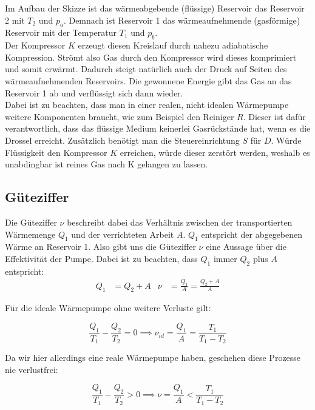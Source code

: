 Im Aufbau der Skizze ist das wärmeabgebende (flüssige) Reservoir das Reservoir 2 mit $T_{2}$ und $p_{a}$. Demnach ist Reservoir 1 das wärmeaufnehmende
(gasförmige) Reservoir mit der Temperatur $T_{1}$ und $p_{b}$. \\

Der Kompressor $K$ erzeugt diesen Kreislauf durch nahezu adiabatische Kompression. Strömt also Gas durch den 
Kompressor wird dieses komprimiert und somit erwärmt.
Dadurch steigt natürlich auch der Druck auf Seiten des wärmeaufnehmenden Reservoirs.
Die gewonnene Energie gibt das Gas an das Reservoir 1 ab und verflüssigt sich dann wieder.\\

Dabei ist zu beachten, dass man in einer realen, nicht idealen Wärmepumpe weitere Komponenten braucht, wie zum Beispiel den Reiniger $R$.
Dieser ist dafür verantwortlich, dass das flüssige Medium keinerlei Gasrückstände hat, wenn es die Drossel erreicht.
Zusätzlich benötigt man die Steuereinrichtung $S$ für $D$. Würde Flüssigkeit den Kompressor $K$ erreichen, würde dieser zerstört werden,
weshalb es unabdingbar ist reines Gas nach K gelangen zu lassen.

\subsection{Güteziffer} \label{sec:Güteziffer}

Die Güteziffer $\nu$ beschreibt dabei das Verhältnis zwischen der transportierten Wärmemenge $Q_{1}$ und der verrichteten Arbeit $A$.
$Q_{1}$ entspricht der abgegebenen Wärme an Reservoir 1. Also gibt uns die Güteziffer $\nu$ eine Aussage über die Effektivität der Pumpe.
Dabei ist zu beachten, dass $Q_{1}$ immer $Q_{2}$ plus $A$ entspricht:
\begin{align} \label{eq:Güteziffer}
    Q_{1} &= Q_{2} + A & \nu &= \frac{Q_{1}}{A} = \frac{Q_{2} + A}{A}
\end{align}

Für die ideale Wärmepumpe ohne weitere Verluste gilt:

\begin{equation} \label{eq:nu_id}
    \frac{Q_{1}}{T_{1}} - \frac{Q_{2}}{T_{2}} = 0 \implies \nu_{id} = \frac{Q_{1}}{A} = \frac{T_{1}}{T_{1} - T_{2}}
\end{equation}

Da wir hier allerdings eine reale Wärmepumpe haben, geschehen diese Prozesse nie verlustfrei:

\begin{equation}
    \frac{Q_{1}}{T_{1}} - \frac{Q_{2}}{T_{2}} > 0 \implies \nu = \frac{Q_{1}}{A} < \frac{T_{1}}{T_{1} - T_{2}}
\end{equation}

